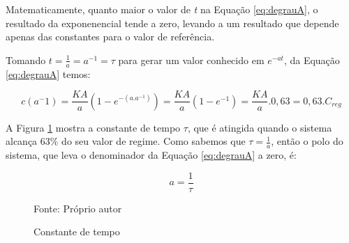 






Matematicamente, quanto maior o valor de \emph{t} na Equação \ref{eq:degrauA}, o resultado da exponenencial tende a zero, levando a um resultado que depende apenas das constantes para o valor de referência. 

Tomando $t= \frac{1}{a} = a^{-1} = \tau$ para gerar um valor conhecido em $e^{-at}$, da Equação \ref{eq:degrauA} temos:


\begin{equation}
c(a^-1) = \frac{KA}{a}(1-e^{-(a.a^{-1})}) = \frac{KA}{a}(1-e^{-1}) = \frac{KA}{a}.0,63 = 0,63 . C_{reg}
\end{equation}

A Figura \ref{fig:AnexoBconstTempo} mostra a constante de tempo $\tau$, que é atingida quando o sistema alcança 63\% do seu valor de regime. Como sabemos que $\tau = \frac{1}{a}$, então o polo do sistema, que leva o denominador da Equação \ref{eq:degrauA} a zero, é:

\begin{equation}
a = \frac{1}{\tau}
\end{equation}



\begin{figure}
\centering
\caption{Constante de tempo}
\label{fig:AnexoBconstTempo}

{\small Fonte: Próprio autor}
\end{figure}

